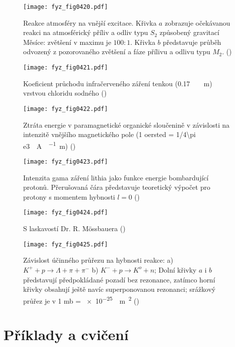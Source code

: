     \begin{figure}[ht!] %
      \centering
      \texttt{[image: fyz\_fig0420.pdf]}
      \caption{Reakce atmosféry na vnější excitace. Křivka \(a\) zobrazuje očekávanou reakci na
              atmosférický příliv a odliv typu \(S_2\) způsobený gravitací Měsíce: zvětšení v maximu
              je \(100:1\). Křivka \(b\) představuje průběh odvozený z pozorovaného zvětšení a fáze
              přílivu a odlivu typu \(M_2\). (\cite[s.~318]{Feynman01})}
      \label{fyz:fig0420}
    \end{figure}

    \begin{figure}[ht!] %
      \centering
      \texttt{[image: fyz\_fig0421.pdf]}
      \caption{Koeficient průchodu infračerveného záření tenkou
               (\protect\SI{0.17}{\protect\micro\protect\m}) vrstvou chloridu sodného
               (\cite[s.~319]{Feynman01})}
      \label{fyz:fig0421}
    \end{figure}
  
    \begin{figure}[ht!] %
      \centering
      \texttt{[image: fyz\_fig0422.pdf]}
      \caption{Ztráta energie v paramagnetické organické sloučenině v závislosti na intenzitě
               vnějšího magnetického pole (1 oersted = \protect\SI{1/4\pi
               e3}{\protect\ampere\protect\per\protect\meter}) (\cite[s.~320]{Feynman01})}
      \label{fyz:fig0422}
    \end{figure}
  
    \begin{figure}[ht!] %
      \centering
      \texttt{[image: fyz\_fig0423.pdf]}
      \caption{Intenzita gama záření lithia jako funkce energie bombardující protonů. Přerušovaná 
               čára představuje teoretický výpočet pro protony s momentem hybnosti \(l=0\)
               (\cite[s.~320]{Feynman01})}
      \label{fyz:fig0423}
    \end{figure}
  
    \begin{figure}[ht!] %
      \centering
      \texttt{[image: fyz\_fig0424.pdf]}
      \caption{S laskavostí Dr. R. M\"{o}ssbauera
               (\cite[s.~321]{Feynman01})}
      \label{fyz:fig0424}
    \end{figure}
  
    \begin{figure}[ht!] %
      \centering
      \texttt{[image: fyz\_fig0425.pdf]}
      \caption{Závislost účinného průřezu na hybnosti reakce: a) \(K^+ + p \rightarrow \Lambda + \pi
              + \pi^-\) b) \(K^- + p \rightarrow K^o + n\); Dolní křivky \(a\) i \(b\) představují
              předpokládané pozadí bez rezonance, zatímco horní křivky obsahují ještě navíc
              superponovanou rezonanci; srážkový průřez je v 1 mb =
              \protect\SI{e-25}{\protect\m\protect\squared} (\cite[s.~321]{Feynman01})}
      \label{fyz:fig0425}
    \end{figure}

  \section{Příklady a cvičení}\label{fyz:IchapXXIIIsecV}
